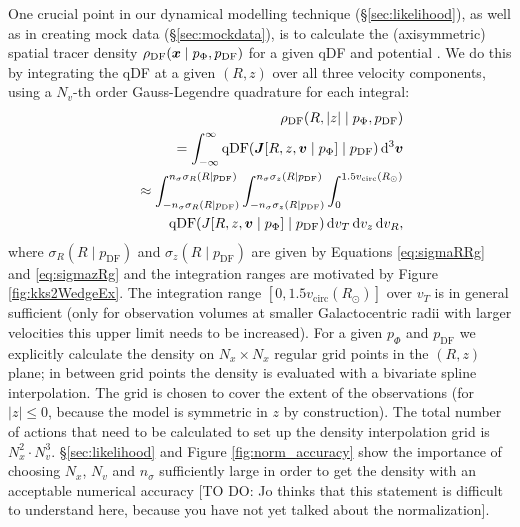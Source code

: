One crucial point in our dynamical modelling technique (\S\ref{sec:likelihood}), as well as in creating mock data (\S\ref{sec:mockdata}), is to calculate the (axisymmetric) spatial tracer density $\rho_\text{DF}(\boldsymbol{x} \mid p_{\Phi},p_\text{DF})$ for a given qDF and potential . We do this by integrating the qDF at a given $(R,z)$ over all three velocity components, using a $N_v$-th order Gauss-Legendre quadrature for each integral:
\begin{eqnarray}
&&\rho_\text{DF}(R,|z| \mid p_{\Phi},p_\text{DF}) \nonumber\\
&&= \int_{-\infty}^{\infty} \text{qDF}(\vect{J}[R,z,\vect{v} \mid p_{\Phi}] \mid p_\text{DF}) \Diff3\vect{v}  \\%
&&\approx \int_{-n_\sigma \sigma_R(R \mid p_\text{DF})}^{n_\sigma \sigma_R(R \mid p_\text{DF})} \int_{-n_\sigma\sigma_z(R \mid p_\text{DF})}^{n_\sigma \sigma_z(R \mid p_\text{DF})} \int_{0}^{1.5 v_\text{circ}(R_\odot)}  \nonumber\\
& & \hspace{1cm} \text{qDF}(J[R,z,\vect{v} \mid p_{\Phi}] \mid p_\text{DF}) \diff v_T \diff v_z \diff v_R, \label{eq:tracerdensity}
\end{eqnarray}
where $\sigma_R(R \mid p_\text{DF})$ and $\sigma_z(R \mid p_\text{DF})$ are given by Equations \ref{eq:sigmaRRg} and \ref{eq:sigmazRg} and the integration ranges are motivated by Figure \ref{fig:kks2WedgeEx}. The integration range $[0,1.5 v_\text{circ}(R_\odot)]$ over $v_T$ is in general sufficient (only for observation volumes at smaller Galactocentric radii with larger velocities this upper limit needs to be increased). For a given $p_\Phi$ and $p_\text{DF}$ we explicitly calculate the density on $N_x \times N_x$ regular grid points in the $(R,z)$ plane; in between grid points the density is evaluated with a bivariate spline interpolation. The grid is chosen to cover the extent of the observations (for $|z|\leq0$, because the model is symmetric in $z$ by construction). The total number of actions that need to be calculated to set up the density interpolation grid is $N_x^2 \cdot N_v^3$. \S\ref{sec:likelihood} and Figure \ref{fig:norm_accuracy} show the importance of choosing $N_x$, $N_v$ and $n_\sigma$ sufficiently large in order to get the density with an acceptable numerical accuracy [TO DO: Jo thinks that this statement is difficult to understand here, because you have not yet talked about the normalization]. 



